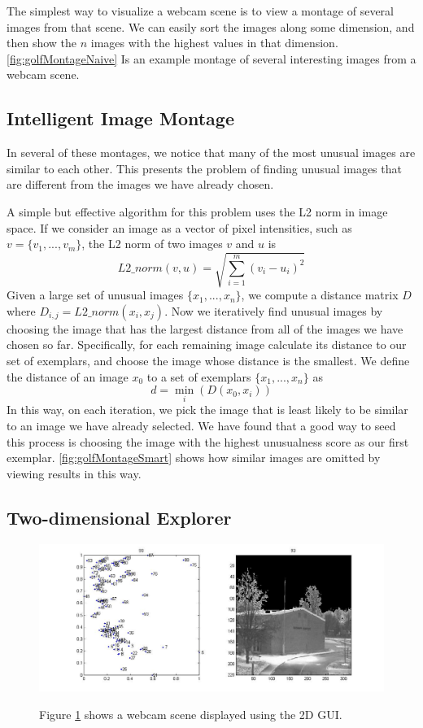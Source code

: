 The simplest way to visualize a webcam scene is to view a montage of several images from that scene.  We can easily sort the images along some dimension, and then show the $n$ images with the highest values in that dimension.  \ref{fig:golfMontageNaive} Is an example montage of several interesting images from a webcam scene.

\subsection{Intelligent Image Montage}

In several of these montages, we notice that many of the most unusual images are similar to each other.  This presents the problem of finding unusual images that are different from the images we have already chosen.

A simple but effective algorithm for this problem uses the L2 norm in image space.  If we consider an image as a vector of pixel intensities, such as $v = \{v_1, ..., v_m\}$, the L2 norm of two images $v$ and $u$ is $$L2\_norm(v,u) = \sqrt{\sum_{i=1}^m{(v_i-u_i)^2}}$$  Given a large set of unusual images $\{x_1, ..., x_n\}$, we compute a distance matrix $D$ where $D_{i,j} = L2\_norm(x_i, x_j).$  Now we iteratively find unusual images by choosing the image that has the largest distance from all of the images we have chosen so far.  Specifically, for each remaining image calculate its distance to our set of exemplars, and choose the image whose distance is the smallest.  We define the distance of an image $x_0$ to a set of exemplars $\{x_1, ..., x_n\}$ as $$d = \min_i(D(x_0, x_i))$$In this way, on each iteration, we pick the image that is least likely to be similar to an image we have already selected.  We have found that a good way to seed this process is choosing the image with the highest unusualness score as our first exemplar.  \ref{fig:golfMontageSmart} shows how similar images are omitted by viewing results in this way.

\subsection{Two-dimensional Explorer}


\begin{figure}
	\centering
		\includegraphics[width=1\textwidth]{figures/2dGui.jpg}
	\label{fig:2dGui}
	
		\caption[Exploring 2D image space using a simple GUI.]{Figure \ref{fig:2dGui} shows a webcam scene displayed using the 2D GUI.}
\end{figure}

